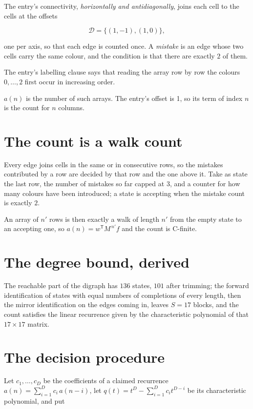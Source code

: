\documentclass[11pt]{article}
\theoremstyle{definition}
\begin{document}
The entry's connectivity, {\itshape horizontally and antidiagonally}, joins each cell to the cells at the offsets

\[\mathcal{D} = \{(1,-1), (1,0)\},\]

one per axis, so that each edge is counted once. A {\itshape mistake} is an edge whose two cells carry the same colour, and the condition is that there are exactly $2$ of them.

The entry's labelling clause says that reading the array row by row the colours $0,\dots,2$ first occur in increasing order.

$a(n)$ is the number of such arrays. The entry's offset is 1, so its term of index $n$ is the count for $n$ columns.

\section{The count is a walk count}

Every edge joins cells in the same or in consecutive rows, so the mistakes contributed by a row are decided by that row and the one above it. Take as state the last row, the number of mistakes so far capped at $3$, and a counter for how many colours have been introduced; a state is accepting when the mistake count is exactly $2$.

An array of $n'$ rows is then exactly a walk of length $n'$ from the empty state to an accepting one, so $a(n) = w^{\mathsf T}M^{\,n'}f$ and the count is C-finite.

\section{The degree bound, derived}

The reachable part of the digraph has $136$ states, $101$ after trimming; the forward identification of states with equal numbers of completions of every length, then the mirror identification on the edges coming in, leaves $S = 17$ blocks, and the count satisfies the linear recurrence given by the characteristic polynomial of that $17\times17$ matrix.

\section{The decision procedure}

Let $c_1,\dots,c_D$ be the coefficients of a claimed recurrence $a(n) = \sum_{i=1}^{D} c_i\,a(n-i)$, let $q(t) = t^{D} - \sum_{i=1}^{D} c_i t^{D-i}$ be its characteristic polynomial, and put
\end{document}
